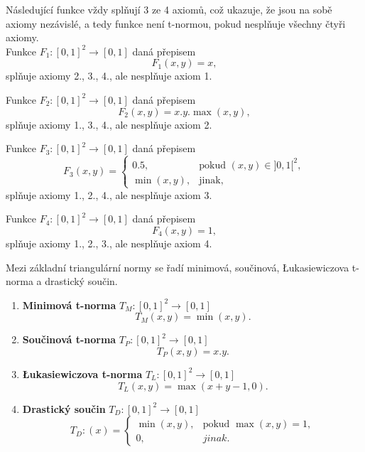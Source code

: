 \begin{example} N\'asleduj\'ic\'i funkce vždy spl\v nují 3 ze 4  axiom\r u, což ukazuje, že jsou na sobě axiomy nez\' avislé, a tedy funkce není t-normou, pokud nespl\v nuje všechny čtyři axiomy.\\ 
    Funkce $F_1 : [0, 1]^2 \to [0, 1]$ daná přepisem
    $$F_1(x,y) = x,$$
    spl\v nuje axiomy 2., 3., 4., ale nespl\v nuje axiom 1.
    
    Funkce $F_2 : [0, 1]^2 \to [0, 1]$ daná přepisem
    $$F_2(x,y) = x.y.\max(x,y),$$
    spl\v nuje axiomy 1., 3., 4., ale nespl\v nuje axiom 2.

    Funkce $F_3 : [0, 1]^2 \to [0, 1]$ daná přepisem
    $$ F_3(x,y)=\begin{cases} 0.5, & \mbox{pokud }(x, y) \in ]0,1[^2, \\
         \min(x,y), & \mbox{jinak,}\end{cases} $$
    spl\v nuje axiomy 1., 2., 4., ale nespl\v nuje axiom 3.
    
    Funkce $F_4 : [0, 1]^2 \to [0, 1]$ daná přepisem
    $$F_4(x,y) = 1,$$
    spl\v nuje axiomy 1., 2., 3., ale nespl\v nuje axiom 4.

  \end{example}

Mezi základní triangulární normy se řadí minimová, součinová, Łukasiewiczova t-norma a drastický součin.
\begin{example}
\cite{KMP}
    \begin{enumerate}
    \item \textbf{Minimová t-norma} $T_M: [0,1]^2 \rightarrow [0,1]$
    $$T_M(x,y) = \min(x,y).$$
    \item \textbf{Součinová t-norma} $T_P: [0,1]^2 \rightarrow [0,1]$
    $$T_P(x,y) = x.y.$$
    \item \textbf{Łukasiewiczova t-norma} $T_L: [0,1]^2 \rightarrow [0,1]$
    $$T_L(x,y) = \max(x+y-1,0).$$
    \item \textbf{Drastický součin} $T_D: [0,1]^2 \rightarrow [0,1]$
    $$T_D:(x)=\begin{cases} \min(x,y), & \mbox{pokud }  \max(x,y) = 1,\\ 
    0, &  jinak.  \end{cases}$$\\
\end{enumerate}
\end{example}




